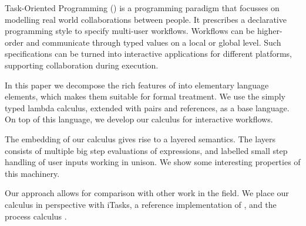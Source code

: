 
Task-Oriented Programming (\TOP) is a programming paradigm that focusses on modelling real world collaborations between people.
It prescribes a declarative programming style to specify multi-user workflows.
Workflows can be higher-order and communicate through typed values on a local or global level.
Such specifications can be turned into interactive applications for different platforms,
supporting collaboration during execution.

In this paper we decompose the rich features of \TOP into elementary language elements,
which makes them suitable for formal treatment.
We use the simply typed lambda calculus, extended with pairs and references, as a base language.
On top of this language, we develop our calculus for interactive workflows.

The embedding of our calculus gives rise to a layered semantics.
The layers consists of multiple big step evaluations of expressions,
and labelled small step handling of user inputs working in unison.
We show some interesting properties of this machinery.

Our approach allows for comparison with other work in the field.
We place our calculus in perspective with iTasks, a reference implementation of \TOP,
and the process calculus \CSP.

